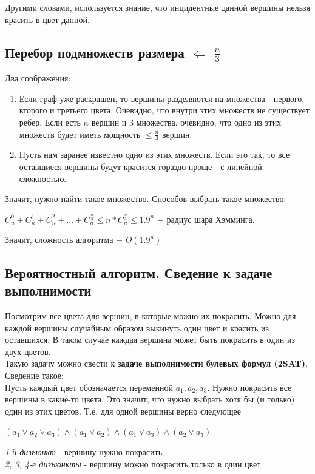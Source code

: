         Другими словами, используется знание, что инцидентные данной вершины нельзя красить в цвет данной.
    
    
    \subsection{Перебор подмножеств размера $\Longleftarrow$ $\frac{n}{3}$}

        Два соображения:
        \begin{enumerate}
            \item Если граф уже раскрашен, то вершины разделяются на множества - первого, второго и третьего цвета. Очевидно, что внутри этих множеств не существует ребер. Если есть $n$ вершин и 3 множества, очевидно, что одно из этих множеств будет иметь мощность $\leq \frac{n}{3}$ вершин.
            \item Пусть нам заранее известно одно из этих множеств. Если это так, то все оставшиеся вершины будут красится гораздо проще - с линейной сложностью.
        \end{enumerate}

        Значит, нужно найти такое множество. Способов выбрать такое множество:
        \begin{center}
            $ C_n^0 + C_n^1 + C_n^2 + ... + C_n^{\frac{n}{3}} \leq n * C_n^{\frac{n}{3}} \leq 1.9^n$ $-$ радиус шара Хэмминга.
        \end{center}

        Значит, сложность алгоритма $-$ $ O(1.9^n)$

    \subsection{Вероятностный алгоритм. Сведение к задаче выполнимости}

        Посмотрим все цвета для вершин, в которые можно их покрасить. Можно для каждой вершины случайным образом выкинуть один цвет и красить из оставшихся. В таком случае каждая вершина может быть покрасить в один из двух цветов.\\
    
        Такую задачу можно свести к \textbf{задаче выполнимости булевых формул (2SAT)}.\\
    
        Сведение такое:\\
    
        Пусть каждый цвет обозначается переменной $a_1, a_2, a_3$. Нужно покрасить все вершины в какие-то цвета. Это значит, что нужно выбрать хотя бы (и только) один из этих цветов. Т.е. для одной вершины верно следующее
        \begin{center}
            $(a_1 \vee a_2 \vee a_3) \wedge (\overline{a_1} \vee \overline{a_2}) \wedge (\overline{a_1} \vee \overline{a_3}) \wedge (\overline{a_2} \vee \overline{a_3})$
        \end{center}
        \textit{1-й дизъюнкт} - вершину нужно покрасить\\
        \textit{2, 3, 4-е дизъюнкты} - вершину можно покрасить только в один цвет.\\
    
